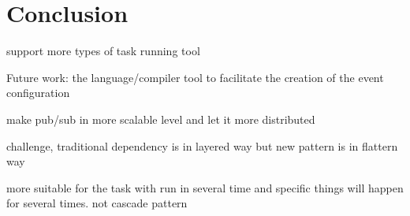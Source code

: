 \section{Conclusion}

support more types of task running tool

Future work: the language/compiler tool to facilitate the creation of the event configuration

make pub/sub in more scalable level and let it more distributed

challenge, traditional dependency is in layered way but new pattern is in flattern way

more suitable for the task with run in several time and specific things will happen for several times. not cascade pattern